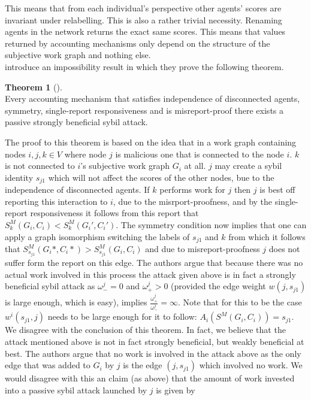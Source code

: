 \documentclass[11pt,a4paper]{report}
\theoremstyle{definition}
\theoremstyle{theorem}
\newtheorem{theorem}{Theorem}[section]
\theoremstyle{proposition}
\theoremstyle{corollary}
\theoremstyle{lemma}
\theoremstyle{example}
\theoremstyle{remark}
\begin{document}
\noindent{}This means that from each individual's perspective other agents' scores are invariant under relabelling. This is also a rather trivial necessity. Renaming agents in the network returns the exact same scores. This means that values returned by accounting mechanisms only depend on the structure of the subjective work graph and nothing else. \vspace{1em}\\

\noindent{}\cite{On the Sybil-Proofness of Accounting Mechanisms} introduce an impossibility result in which they prove the following theorem.

\begin{theorem}[]\ \\
Every accounting mechanism that satisfies independence of disconnected agents, symmetry, single-report responsiveness and is misreport-proof there exists a passive strongly beneficial sybil attack.
\end{theorem}

\noindent{}The proof to this theorem is based on the idea that in a work graph containing nodes $i,j,k\in{}V$ where node $j$ is malicious one that is connected to the node $i$. $k$ is not connected to $i$'s subjective work graph $G_i$ at all. $j$ may create a sybil identity $s_{j1}$ which will not affect the scores of the other nodes, bue to the independence of disconnected agents. If $k$ performs work for $j$ then $j$ is best off reporting this interaction to $i$, due to the misrport-proofness, and by the single-report responsiveness it follows from this report that $S^M_k(G_i,C_i) < S^M_k(G_i',C_i')$. The symmetry condition now implies that one can apply a graph isomorphism switching the labels of $s_{j1}$ and $k$ from which it follows that $S^M_{s_{j1}}(G_i*,C_i*) > S^M_{s_{j1}}(G_i,C_i)$ and due to misreport-proofness $j$ does not suffer form the report on this edge. The authors argue that because there was no actual work involved in this process the attack given above is in fact a strongly beneficial sybil attack as $\omega^j_{-}=0$ and $\omega^j_{+}>0$ (provided the edge weight $w(j,s_{j1})$ is large enough, which is easy), implies $\frac{\omega^j_{+}}{\omega^j_{-}}=\infty$. Note that for this to be the case $w^i(s_{j1},j)$ needs to be large enough for it to follow: $A_i(S^M(G_i,C_i))=s_{j1}$. \vspace{1em}\\

\noindent{}We disagree with the conclusion of this theorem. In fact, we believe that the attack mentioned above is not in fact strongly beneficial, but weakly beneficial at best. The authors argue that no work is involved in the attack above as the only edge that was added to $G_i$ by $j$ is the edge $(j,s_{j1})$ which involved no work. We would disagree with this an claim (as above) that the amount of work invested into a passive sybil attack launched by $j$ is given by 
\end{document}

